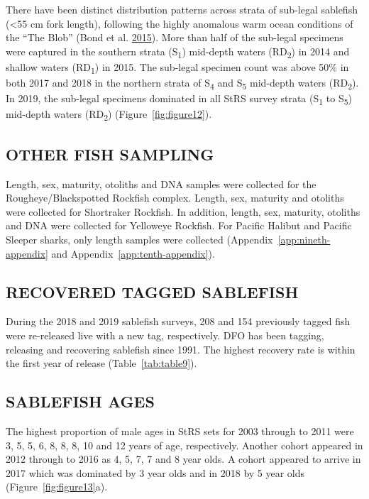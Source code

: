 \documentclass[12pt]{article}\usepackage[]{graphicx}\usepackage[]{color}
\begin{document}
There have been distinct distribution patterns across strata of sub-legal sablefish (\textless55 cm fork length), following the highly anomalous warm ocean conditions of the ``The Blob'' (Bond et al. \protect\hyperlink{ref-Bond2015}{2015}). More than half of the sub-legal specimens were captured in the southern strata (S\textsubscript{1}) mid-depth waters (RD\textsubscript{2}) in 2014 and shallow waters (RD\textsubscript{1}) in 2015. The sub-legal specimen count was above 50\% in both 2017 and 2018 in the northern strata of S\textsubscript{4} and S\textsubscript{5} mid-depth waters (RD\textsubscript{2}). In 2019, the sub-legal specimens dominated in all StRS survey strata (S\textsubscript{1} to S\textsubscript{5}) mid-depth waters (RD\textsubscript{2}) (Figure~\ref{fig:figure12}).

\hypertarget{other-fish-sampling}{%
\subsection{OTHER FISH SAMPLING}\label{other-fish-sampling}}

Length, sex, maturity, otoliths and DNA samples were collected for the Rougheye/Blackspotted Rockfish complex. Length, sex, maturity and otoliths were collected for Shortraker Rockfish. In addition, length, sex, maturity, otoliths and DNA were collected for Yelloweye Rockfish. For Pacific Halibut and Pacific Sleeper sharks, only length samples were collected (Appendix~\ref{app:nineth-appendix} and Appendix~\ref{app:tenth-appendix}).

\hypertarget{recovered-tagged-sablefish}{%
\subsection{RECOVERED TAGGED SABLEFISH}\label{recovered-tagged-sablefish}}

During the 2018 and 2019 sablefish surveys, 208 and 154 previously tagged fish were re-released live with a new tag, respectively. DFO has been tagging, releasing and recovering sablefish since 1991. The highest recovery rate is within the first year of release (Table~\ref{tab:table9}).

\hypertarget{sablefish-ages}{%
\subsection{SABLEFISH AGES}\label{sablefish-ages}}

The highest proportion of male ages in StRS sets for 2003 through to 2011 were 3, 5, 5, 6, 8, 8, 8, 10 and 12 years of age, respectively. Another cohort appeared in 2012 through to 2016 as 4, 5, 7, 7 and 8 year olds. A cohort appeared to arrive in 2017 which was dominated by 3 year olds and in 2018 by 5 year olds (Figure~\ref{fig:figure13}a).
\end{document}
